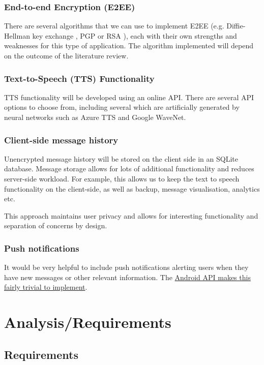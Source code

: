 \documentclass{mproj}
\begin{document}
\subsection{End-to-end Encryption (E2EE)}
There are several algorithms that we can use to implement E2EE (e.g. Diffie-Hellman key exchange \cite{diffie1979privacy}, PGP \cite{garfinkel1995pgp} or RSA  \cite{milanov2009rsa}), each with their own strengths and weaknesses for this type of application. The algorithm implemented will depend on the outcome of the literature review.
\subsection{Text-to-Speech (TTS) Functionality}
TTS functionality will be developed using an online API. There are several API options to choose from, including several which are artificially generated by neural networks such as Azure TTS\cite{tan2021survey} and Google WaveNet\cite{oord2016wavenet}.
\subsection{Client-side message history}
Unencrypted message history will be stored on the client side in an SQLite database. Message storage allows for lots of additional functionality and reduces server-side workload. For example, this allows us to keep the text to speech functionality on the client-side, as well as backup, message visualisation, analytics etc.

This approach maintains user privacy and allows for interesting functionality and separation of concerns by design.
\subsection{Push notifications}
It would be very helpful to include push notifications alerting users when they have new messages or other relevant information. The \href{https://developer.android.com/guide/topics/ui/notifiers/notifications}{Android API makes this fairly trivial to implement}.


\chapter{Analysis/Requirements}\label{analysis}
\section{Requirements}
\end{document}
